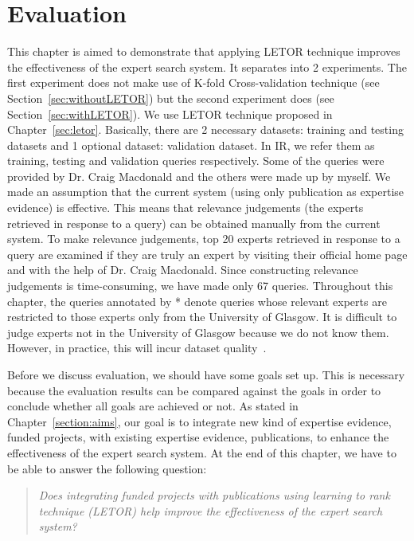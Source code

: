
\chapter{Evaluation}\label{sec:evaluation}

This chapter is aimed to demonstrate that applying LETOR technique improves the effectiveness of the expert search system. 
It separates into 2 experiments. The first experiment does not make use of K-fold Cross-validation technique (see Section~\ref{sec:withoutLETOR})
but the second experiment does (see Section~\ref{sec:withLETOR}).
We use LETOR technique proposed in Chapter~\ref{sec:letor}. Basically, there are 2 necessary datasets: training and testing datasets and 1 optional dataset:
validation dataset. In IR, we refer them as training, testing and validation queries respectively. 
Some of the queries were provided by Dr. Craig Macdonald and the others were made up by myself. 
We made an assumption that the current system (using only publication as expertise evidence) is effective. This means that relevance judgements 
(the experts retrieved in response to a query) can be obtained manually from the current system. To make relevance judgements, top 20 experts retrieved in response to a query
are examined if they are truly an expert by visiting their official home page and with the help of Dr. Craig Macdonald.
Since constructing relevance judgements is time-consuming, we have made only 67 queries. 
Throughout this chapter, the queries annotated by * denote queries whose relevant experts are restricted to those experts only from 
the University of Glasgow. It is difficult to judge experts not in the University of Glasgow because we 
do not know them. However, in practice, this will incur dataset quality~\cite{craig}.

Before we discuss evaluation, we should have some goals set up. This is necessary because the evaluation results can be compared against the goals in order to
conclude whether all goals are achieved or not. As stated in Chapter~\ref{section:aims}, our goal is to integrate new kind of expertise evidence, funded projects,
with existing expertise evidence, publications, to enhance the effectiveness of the expert search system. At the end of this chapter, we have to be able to 
answer the following question:

\begin{quotation}
 \textit{Does integrating funded projects with publications using learning to rank technique (LETOR) help improve the effectiveness 
 of the expert search system?}
\end{quotation}


